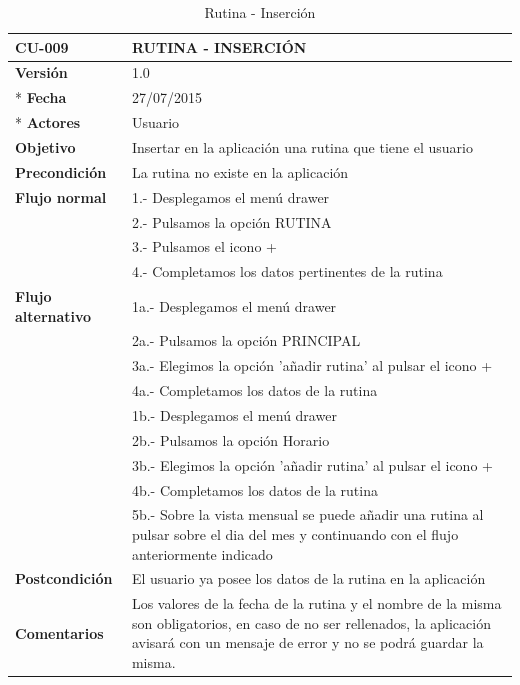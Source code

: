 \documentclass[../pfc.tex]{subfiles}
\begin{document}
		\begin{table}[H]
			\centering
			\begin{tabular}[t]{|p{3cm}|p{9.5cm}|}
				\hline \textbf{CU-009} & \textbf{RUTINA - INSERCIÓN} \\*
				\hline\hline \textbf{Versión} & 1.0 \\ *
				\hline\hline \textbf{Fecha} & 27/07/2015 \\ *
				\hline\textbf{Actores} 	& Usuario\\*
				\hline \textbf{Objetivo} & Insertar en la aplicación una rutina que tiene el usuario\\* 			
				\hline \textbf{Precondición} & La rutina no existe en la aplicación\\* 
				\hline \textbf{Flujo normal} & 1.- Desplegamos el menú drawer \\* 
				& 2.- Pulsamos la opción RUTINA\\*	
				& 3.- Pulsamos el icono +\\*	
				& 4.- Completamos los datos pertinentes de la rutina\\*	
				\hline \textbf{Flujo alternativo} & 1a.- Desplegamos el menú drawer \\* 
				& 2a.- Pulsamos la opción PRINCIPAL \\*	
				& 3a.- Elegimos la opción 'añadir rutina' al pulsar el icono +\\*	
				& 4a.- Completamos los datos de la rutina\\*	
				& 1b.- Desplegamos el menú drawer \\* 
				& 2b.- Pulsamos la opción Horario \\*	
				& 3b.- Elegimos la opción 'añadir rutina' al pulsar el icono +\\*	
				& 4b.- Completamos los datos de la rutina\\*	
				& 5b.- Sobre la vista mensual se puede añadir una rutina al pulsar sobre el dia del mes y continuando con el flujo anteriormente indicado\\*	
				\hline \textbf{Postcondición} & El usuario ya posee los datos de la rutina en la aplicación \\* 
				\hline \textbf{Comentarios}   & Los valores de la fecha de la rutina y el nombre de la misma son obligatorios, en caso de no ser rellenados, la aplicación avisará con un mensaje de error y no se podrá guardar la misma.\\*
				\hline
			\end{tabular}
			\caption{Rutina - Inserción}
			\label{tabla:caso009}
		\end{table}
		
\end{document}
